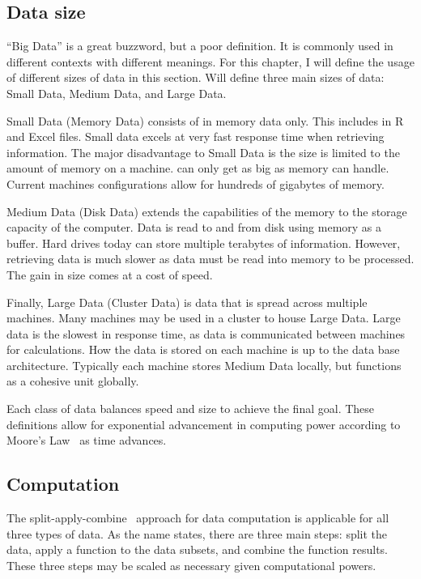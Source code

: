 \documentclass[stat,dissertation]{puthesis}\usepackage[]{graphicx}\usepackage{xcolor}
\begin{document}
\subsection{Data size}

``Big Data'' is a great buzzword, but a poor definition.  It is commonly used in different contexts with different meanings.  For this chapter, I will define the usage of different sizes of data in this section.  Will define three main sizes of data:  Small Data, Medium Data, and Large Data.

Small Data (Memory Data) consists of in memory data only.  This includes  in R and Excel files.  Small data excels at very fast response time when retrieving information.  The major disadvantage to Small Data is the size is limited to the amount of memory on a machine.   can only get as big as memory can handle.  Current machines configurations allow for hundreds of gigabytes of memory.

Medium Data (Disk Data) extends the capabilities of the memory to the storage capacity of the computer.  Data is read to and from disk using memory as a buffer.  Hard drives today can store multiple terabytes of information.  However, retrieving data is much slower as data must be read into memory to be processed.  The gain in size comes at a cost of speed.

Finally, Large Data (Cluster Data) is data that is spread across multiple machines. Many machines may be used in a cluster to house Large Data.  Large data is the slowest in response time, as data is communicated between machines for calculations.  How the data is stored on each machine is up to the data base architecture.  Typically each machine stores Medium Data locally, but functions as a cohesive unit globally.

Each class of data balances speed and size to achieve the final goal.  These definitions allow for exponential advancement in computing power according to Moore's Law~\cite{Moore1965} as time advances.

\subsection{Computation}

The split-apply-combine~\cite{plyr} approach for data computation is applicable for all three types of data.  As the name states, there are three main steps: split the data, apply a function to the data subsets, and combine the function results.  These three steps may be scaled as necessary given computational powers.
\end{document}
